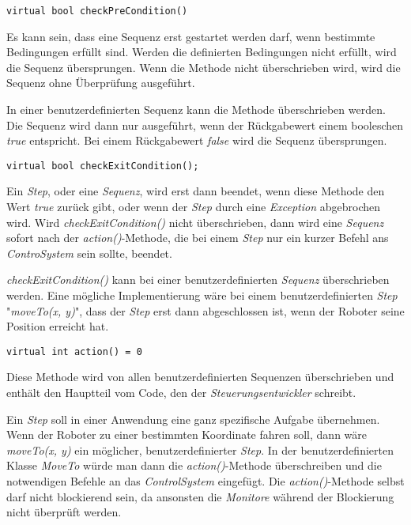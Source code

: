 \begin{lstlisting}
virtual bool checkPreCondition()
\end{lstlisting}
Es kann sein, dass eine Sequenz erst gestartet werden darf, wenn bestimmte Bedingungen erfüllt sind.
Werden die definierten Bedingungen nicht erfüllt, wird die Sequenz übersprungen.
Wenn die Methode nicht überschrieben wird, wird die Sequenz ohne Überprüfung ausgeführt.

In einer benutzerdefinierten Sequenz kann die Methode überschrieben werden.
Die Sequenz wird dann nur ausgeführt, wenn der Rückgabewert einem booleschen \textit{true} entspricht.
Bei einem Rückgabewert \textit{false} wird die Sequenz übersprungen.


\begin{lstlisting}
virtual bool checkExitCondition();
\end{lstlisting}
Ein \textit{Step}, oder eine \textit{Sequenz}, wird erst dann beendet, wenn diese Methode den Wert \textit{true} zurück gibt, oder wenn der \textit{Step} durch eine \textit{Exception} abgebrochen wird.
Wird \textit{checkExitCondition()} nicht überschrieben, dann wird eine \textit{Sequenz} sofort nach der \textit{action()}-Methode, die bei einem \textit{Step} nur ein kurzer Befehl ans \textit{ControSystem} sein sollte, beendet.

\textit{checkExitCondition()} kann bei einer benutzerdefinierten \textit{Sequenz} überschrieben werden.
Eine mögliche Implementierung wäre bei einem benutzerdefinierten \textit{Step} "\textit{moveTo(x, y)}", dass der \textit{Step} erst dann abgeschlossen ist, wenn der Roboter seine Position erreicht hat.



\begin{lstlisting}
virtual int action() = 0
\end{lstlisting}
Diese Methode wird von allen benutzerdefinierten Sequenzen überschrieben und enthält den Hauptteil vom Code, den der \textit{Steuerungsentwickler} schreibt.

Ein \textit{Step} soll in einer Anwendung eine ganz spezifische Aufgabe übernehmen.
Wenn der Roboter zu einer bestimmten Koordinate fahren soll, dann wäre \textit{moveTo(x, y)} ein möglicher, benutzerdefinierter \textit{Step}.
In der benutzerdefinierten Klasse \textit{MoveTo} würde man dann die \textit{action()}-Methode überschreiben und die notwendigen Befehle an das \textit{ControlSystem} eingefügt.
Die \textit{action()}-Methode selbst darf nicht blockierend sein, da ansonsten die \textit{Monitore} während der Blockierung nicht überprüft werden.

